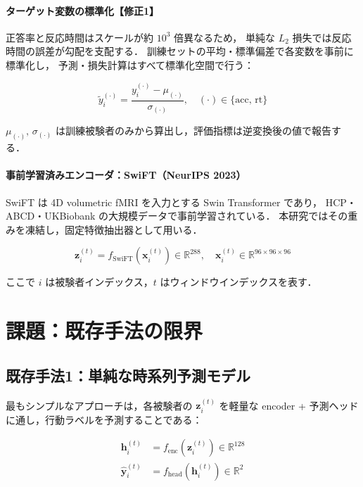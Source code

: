 \documentclass[12pt, a4paper]{ltjsarticle}
\begin{document}
\paragraph{ターゲット変数の標準化【修正1】}
正答率と反応時間はスケールが約 $10^3$ 倍異なるため，
単純な $L_2$ 損失では反応時間の誤差が勾配を支配する．
訓練セットの平均・標準偏差で各変数を事前に標準化し，
予測・損失計算はすべて標準化空間で行う：

\begin{equation}
  \tilde{y}^{(\cdot)}_i
  = \frac{y^{(\cdot)}_i - \mu_{(\cdot)}}{\sigma_{(\cdot)}},
  \quad
  (\cdot) \in \{\text{acc},\,\text{rt}\}
  \label{eq:standardize}
\end{equation}

\noindent
$\mu_{(\cdot)},\,\sigma_{(\cdot)}$ は訓練被験者のみから算出し，評価指標は逆変換後の値で報告する．

\paragraph{事前学習済みエンコーダ：SwiFT（NeurIPS 2023）}
SwiFT は 4D volumetric fMRI を入力とする Swin Transformer であり，
HCP・ABCD・UKBiobank の大規模データで事前学習されている．
本研究ではその重みを凍結し，固定特徴抽出器として用いる．

\begin{equation}
  \bm{z}_i^{(t)} = f_{\text{SwiFT}}\!\left(\bm{x}_i^{(t)}\right) \in \mathbb{R}^{288},
  \quad
  \bm{x}_i^{(t)} \in \mathbb{R}^{96 \times 96 \times 96}
  \label{eq:swift}
\end{equation}

\noindent
ここで $i$ は被験者インデックス，$t$ はウィンドウインデックスを表す．

\section{課題：既存手法の限界}

\subsection{既存手法1：単純な時系列予測モデル}

最もシンプルなアプローチは，各被験者の $\bm{z}_i^{(t)}$ を軽量な
encoder + 予測ヘッドに通し，行動ラベルを予測することである：

\begin{align}
  \bm{h}_i^{(t)}   &= f_{\text{enc}}\!\left(\bm{z}_i^{(t)}\right) \in \mathbb{R}^{128}
  \label{eq:enc}
  \\
  \hat{\bm{y}}_i^{(t)} &= f_{\text{head}}\!\left(\bm{h}_i^{(t)}\right) \in \mathbb{R}^2
  \label{eq:head}
\end{align}
\end{document}
